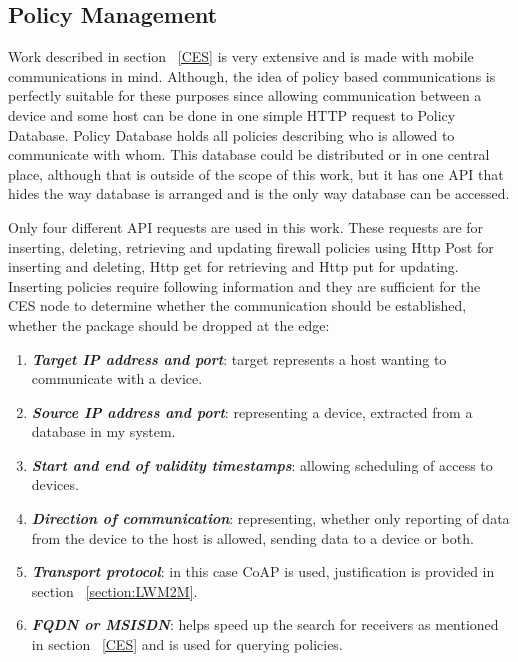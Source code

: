 \subsection{Policy Management}
\label{policyManagement}

Work described in section ~\ref{CES} is very extensive and is made with mobile communications in mind. Although, the idea of policy based communications is perfectly suitable for these purposes since allowing communication between a device and some host can be done in one simple HTTP request to Policy Database. Policy Database holds all policies describing who is allowed to communicate with whom. This database could be distributed or in one central place, although that is outside of the scope of this work, but it has one API that hides the way database is arranged and is the only way database can be accessed. 

Only four different API requests are used in this work. These requests are for inserting, deleting, retrieving and updating firewall policies using Http Post for inserting and deleting, Http get for retrieving and Http put for updating. Inserting policies require following information and they are sufficient for the CES node to determine whether the communication should be established, whether the package should be dropped at the edge: 

\begin{enumerate}
	\setlength{\itemsep}{1pt}
	\item \textbf{\textit{Target IP address and port}}: target represents a host wanting to communicate with a device.
	\item \textbf{\textit{Source IP address and port}}: representing a device, extracted from a database in my system.
	\item \textbf{\textit{Start and end of validity timestamps}}: allowing scheduling of access to devices.
	\item \textbf{\textit{Direction of communication}}: representing, whether only reporting of data from the device to the host is allowed, sending data to a device or both.
	\item \textbf{\textit{Transport protocol}}: in this case CoAP is used, justification is provided in section ~\ref{section:LWM2M}.
	\item \textbf{\textit{FQDN or MSISDN}}: helps speed up the search for receivers as mentioned in section ~\ref{CES} and is used for querying policies.
\end{enumerate}

